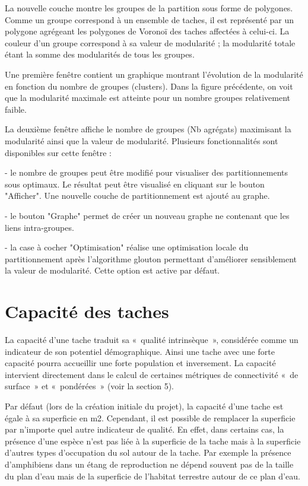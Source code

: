 \documentclass{article}
\begin{document}
La nouvelle couche montre les groupes de la partition sous forme de polygones. Comme un groupe correspond à un ensemble de taches, il est représenté par un polygone agrégeant les polygones de Voronoï des taches affectées à celui-ci. 
La couleur d'un groupe correspond à sa valeur de modularité ; la modularité totale étant la somme des modularités de tous les groupes.

Une première fenêtre contient un graphique montrant l'évolution de la modularité en fonction du nombre de groupes (clusters). Dans la figure précédente, on voit que la modularité maximale est atteinte pour un nombre groupes relativement faible.

La deuxième fenêtre affiche le nombre de groupes (Nb agrégats) maximisant la modularité ainsi que la valeur de modularité. Plusieurs fonctionnalités sont disponibles sur cette fenêtre :

{}- le nombre de groupes peut être modifié pour visualiser des partitionnements sous optimaux. Le résultat peut être visualisé en cliquant sur le bouton "Afficher". Une nouvelle couche de partitionnement est ajouté au graphe.

{}- le bouton "Graphe" permet de créer un nouveau graphe ne contenant que les liens intra-groupes.

{}- la case à cocher "Optimisation" réalise une optimisation locale du partitionnement après l'algorithme glouton permettant d'améliorer sensiblement la valeur de modularité. Cette option est active par défaut.



\section{Capacité des taches}

La capacité d’une tache traduit sa «~qualité intrinsèque~», considérée comme un indicateur de son potentiel démographique. Ainsi une tache avec une forte capacité pourra accueillir une forte population et inversement. La capacité intervient directement dans le calcul de certaines métriques de connectivité «~de surface~» et «~pondérées~» (voir la section 5).

Par défaut (lors de la création initiale du projet), la capacité d’une tache est égale à sa superficie en m2. Cependant, il est possible de remplacer la superficie par n’importe quel autre indicateur de qualité. En effet, dans certains cas, la présence d’une espèce n’est pas liée à la superficie de la tache mais à la superficie d’autres types d’occupation du sol autour de la tache. Par exemple la présence d’amphibiens dans un étang de reproduction ne dépend souvent pas de la taille du plan d’eau mais de la superficie de l’habitat terrestre autour de ce plan d’eau.
\end{document}
